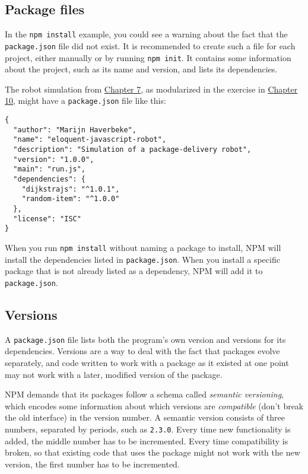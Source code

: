 \subsection{Package files}

In the \lstinline`npm install` example, you could see a warning about the fact that the \lstinline`package.json` file did not exist. It is recommended to create such a file for each project, either manually or by running \lstinline`npm init`. It contains some information about the project, such as its name and version, and lists its dependencies.

The robot simulation from \hyperref[robot]{Chapter 7}, as modularized in the exercise in \hyperref[modules.modular_robot]{Chapter 10}, might have a \lstinline`package.json` file like this:

\begin{lstlisting}
{
  "author": "Marijn Haverbeke",
  "name": "eloquent-javascript-robot",
  "description": "Simulation of a package-delivery robot",
  "version": "1.0.0",
  "main": "run.js",
  "dependencies": {
    "dijkstrajs": "^1.0.1",
    "random-item": "^1.0.0"
  },
  "license": "ISC"
}
\end{lstlisting}
\noindent{}

When you run \lstinline`npm install` without naming a package to install, NPM will install the dependencies listed in \lstinline`package.json`. When you install a specific package that is not already listed as a dependency, NPM will add it to \lstinline`package.json`.

\subsection{Versions}

A \lstinline`package.json` file lists both the program's own version and versions for its dependencies. Versions are a way to deal with the fact that packages evolve separately, and code written to work with a package as it existed at one point may not work with a later, modified version of the package.

NPM demands that its packages follow a schema called \emph{semantic
versioning}, which encodes some information about which versions are \emph{compatible} (don't break the old interface) in the version number. A semantic version consists of three numbers, separated by periods, such as \lstinline`2.3.0`. Every time new functionality is added, the middle number has to be incremented. Every time compatibility is broken, so that existing code that uses the package might not work with the new version, the first number has to be incremented.

